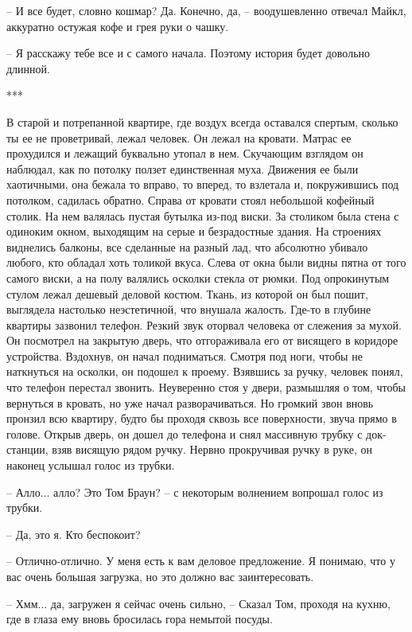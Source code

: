 – И все будет, словно кошмар? Да. Конечно, да, – воодушевленно отвечал Майкл, аккуратно остужая кофе и грея руки о чашку. 

– Я расскажу тебе все и с самого начала. Поэтому история будет довольно длинной.

\begin{center}***\end{center}

В старой и потрепанной квартире, где воздух всегда оставался спертым, сколько ты ее не проветривай, лежал человек. Он лежал на кровати. Матрас ее прохудился и лежащий буквально утопал в нем. Скучающим взглядом он наблюдал, как по потолку ползет единственная муха. Движения ее были хаотичными, она бежала то вправо, то вперед, то взлетала и, покружившись под потолком, садилась обратно. Справа от кровати стоял небольшой кофейный столик. На нем валялась пустая бутылка из-под виски. За столиком была стена с одиноким окном, выходящим на серые и безрадостные здания. На строениях виднелись балконы, все сделанные на разный лад, что абсолютно убивало любого, кто обладал хоть толикой вкуса. Слева от окна были видны пятна от того самого виски, а на полу валялись осколки стекла от рюмки. Под опрокинутым стулом лежал дешевый деловой костюм. Ткань, из которой он был пошит, выглядела настолько неэстетичной, что внушала жалость. Где-то в глубине квартиры зазвонил телефон. Резкий звук оторвал человека от слежения за мухой. Он посмотрел на закрытую дверь, что отгораживала его от висящего в коридоре устройства. Вздохнув, он начал подниматься. Смотря под ноги, чтобы не наткнуться на осколки, он подошел к проему. Взявшись за ручку, человек понял, что телефон перестал звонить. Неуверенно стоя у двери, размышляя о том, чтобы вернуться в кровать, но уже начал разворачиваться. Но громкий звон вновь пронзил всю квартиру, будто бы проходя сквозь все поверхности, звуча прямо в голове.  Открыв дверь, он дошел до телефона и снял массивную трубку с док-станции, взяв висящую рядом ручку. Нервно прокручивая ручку в руке, он наконец услышал голос из трубки.

– Алло... алло? Это Том Браун? – с некоторым волнением вопрошал голос из трубки.

– Да, это я. Кто беспокоит? 

– Отлично-отлично. У меня есть к вам деловое предложение. Я понимаю, что у вас очень большая загрузка, но это должно вас заинтересовать. 

– Хмм... да, загружен я сейчас очень сильно, – Сказал Том, проходя на кухню, где в глаза ему вновь бросилась гора немытой посуды.

